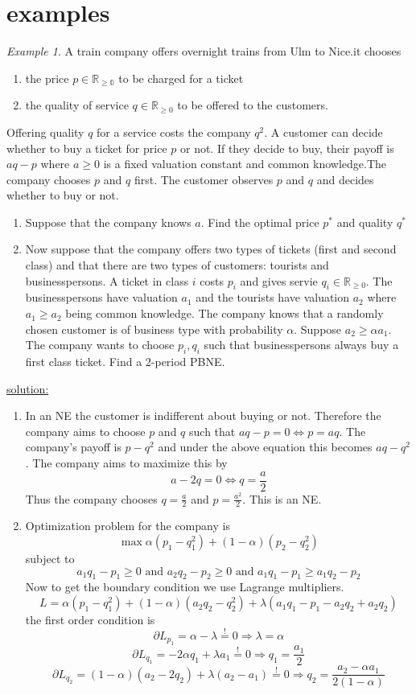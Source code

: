 \documentclass[a4paper, 12pt]{article}
\theoremstyle{plain}
\theoremstyle{definition}
\theoremstyle{lemma}
\theoremstyle{remark}
\theoremstyle{corollary}
\theoremstyle{example}
\newtheorem{example}[theorem]{Example}
\begin{document}
	\section{examples}
	\begin{example}
		A train company offers overnight trains from Ulm to Nice.it chooses \begin{enumerate}
			\item the price $p \in \mathbb{R_{\geq 0}}$ to be charged for a ticket
			\item the quality of service $q \in \mathbb{R}_{\geq 0}$ to be offered to the customers.
		\end{enumerate}
		Offering quality $q$ for a service costs the company $q^2$. A customer can decide whether to buy a ticket for price $p$ or not. If they decide to buy, their payoff is $aq-p$ where $a \geq 0$ is a fixed valuation constant and common knowledge.The company chooses $p$ and $q$ first. The customer observes $p$ and $q$ and decides whether to buy or not.
		\begin{enumerate}
			\item Suppose that the company knows $a$. Find the optimal price $p^*$ and quality $q^*$
			\item Now suppose that the company offers two types of tickets (first and second class) and that there are two types of customers: tourists and businesspersons. A ticket in class $i$ costs $p_i$ and gives servie $q_i \in \mathbb{R}_{\geq 0}$. The businesspersons have valuation $a_1$ and the tourists have valuation $a_2$ where $a_1 \geq a_2$ being common knowledge. The company knows that a randomly chosen customer is of business type with probability $\alpha$. Suppose $a_2 \geq \alpha a_1$. The company wants to choose $p_i,q_i$ such that businesspersons always buy a first class ticket. Find a 2-period PBNE.
		\end{enumerate}
		\underline{solution:}
		\begin{enumerate}
			\item In an NE the customer is indifferent about buying or not. Therefore the company aims to choose $p$ and $q$ such that $aq-p = 0 \Leftrightarrow p = aq$. The company's payoff is $p-q^2$ and under the above equation this becomes $aq-q^2$. The company aims to maximize this by \[a-2q = 0 \Leftrightarrow q = \frac{a}{2}\]
			Thus the company chooses $q = \frac{a}{2}$ and $p = \frac{a^2}{2}$. This is an NE.
			\item Optimization problem for the company is \[\max \alpha (p_1-q_1^2) + (1-\alpha)(p_2-q_2^2)\] subject to \[a_1q_1-p_1 \geq 0 \text{ and } a_2q_2-p_2 \geq 0 \text{ and } a_1q_1-p_1 \geq a_1q_2-p_2\] Now to get the boundary condition we use Lagrange multipliers. \[L = \alpha(p_1-q_1^2) + (1-\alpha)(a_2q_2-q_2^2) + \lambda(a_1q_1-p_1 - a_2q_2 + a_2q_2)\] the first order condition is \[\partial L_{p_1} = \alpha - \lambda \overset{!}{=} 0 \Rightarrow \lambda = \alpha\]
			\[\partial L_{q_1} = -2\alpha q_1 + \lambda a_1 \overset{!}{=} 0 \Rightarrow q_1 = \frac{a_1}{2}\]
			\[\partial L_{q_2} = (1-\alpha)(a_2-2q_2) + \lambda(a_2-a_1) \overset{!}{=} 0 \Rightarrow q_2 = \frac{a_2- \alpha a_1}{2(1-\alpha)}\]
		\end{enumerate}
	\end{example}
\end{document}
